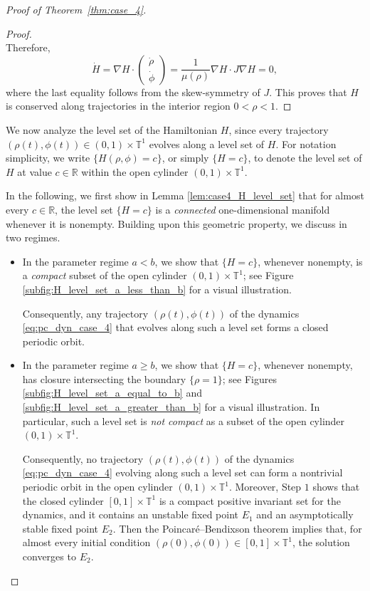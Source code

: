 \documentclass[10pt]{article}
\theoremstyle{definition}
\theoremstyle{definition}
\numberwithin{equation}{section}
\newcommand{\R}{\mathbb{R}}
\newcommand{\BBT}{\mathbb{T}}
\begin{document}
\begin{proof}[Proof of Theorem~\ref{thm:case_4}]
\begin{proof}
\begin{equation}
    \end{equation}
    Therefore,
    \begin{equation*}
        \dot H = \nabla H \cdot \begin{pmatrix}
            \dot \rho \\ \dot \phi
        \end{pmatrix} = \frac{1}{\mu(\rho)} \nabla H \cdot J \nabla H = 0,
    \end{equation*}
    where the last equality follows from the skew-symmetry of $J$. 
    This proves that $H$ is conserved along trajectories in the interior region $0<\rho<1$.
\end{proof}
We now analyze the level set of the Hamiltonian $H$, since every trajectory $(\rho(t), \phi(t)) \in (0,1) \times \BBT^1$ evolves along a level set of $H$.  
For notation simplicity, we write $\{H(\rho, \phi) = c\}$, or simply $\{H = c\}$, to denote the level set of $H$ at value $c \in \R$ within the open cylinder $(0,1) \times \BBT^1$.

In the following, we first show in Lemma \ref{lem:case4_H_level_set} that for almost every $c \in \R$, the level set $\{H=c\}$ is a \emph{connected} one-dimensional manifold whenever it is nonempty.
Building upon this geometric property, we discuss in two regimes.

\begin{itemize}
    \item In the parameter regime $a < b$, we show that $\{H=c\}$, whenever nonempty, is a \emph{compact} subset of the open cylinder $(0,1) \times \BBT^1$; see Figure \ref{subfig:H_level_set_a_less_than_b} for a visual illustration.
    
    Consequently, any trajectory $(\rho(t), \phi(t))$ of the dynamics \eqref{eq:pc_dyn_case_4} that evolves along such a level set forms a closed periodic orbit.

    \item In the parameter regime $a \geq b$, we show that $\{H=c\}$, whenever nonempty, has closure intersecting the boundary $\{\rho=1\}$; see Figures \ref{subfig:H_level_set_a_equal_to_b} and \ref{subfig:H_level_set_a_greater_than_b} for a visual illustration.
    In particular, such a level set is \emph{not compact} as a subset of the open cylinder $(0,1) \times \BBT^1$. 
    
    Consequently, no trajectory $(\rho(t), \phi(t))$ of the dynamics \eqref{eq:pc_dyn_case_4} evolving along such a level set can form a nontrivial periodic orbit in the open cylinder $(0,1) \times \BBT^1$.
    Moreover, Step $1$ shows that the closed cylinder $[0,1] \times \BBT^1$ is a compact positive invariant set for the dynamics, and it contains an unstable fixed point $E_1$ and an asymptotically stable fixed point $E_2$.
    Then the Poincaré--Bendixson theorem \cite{wiggins2003introduction} implies that, for almost every initial condition $(\rho(0), \phi(0)) \in [0,1] \times \BBT^1$, the solution converges to $E_2$. 
\end{itemize}


\end{proof}
\end{document}

